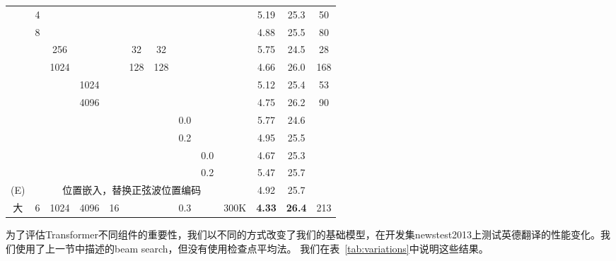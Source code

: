 \begin{table}[t]
\begin{center}
\begin{tabular}{c|ccccccccc|ccc}
& 4 & & & & & & & &            & 5.19 & 25.3 & 50 \\
& 8 & & & & & & & &            & 4.88 & 25.5 & 80 \\
& & 256 & & & 32 & 32 & & &    & 5.75 & 24.5 & 28 \\
& & 1024 & & & 128 & 128 & & & & 4.66 & 26.0 & 168 \\
& & & 1024 & & & & & &         & 5.12 & 25.4 & 53 \\
& & & 4096 & & & & & &         & 4.75 & 26.2 & 90 \\
\hline\rule{0pt}{2.0ex}
\multirow{4}{*}{(D)}
& & & & & & & 0.0 & & & 5.77 & 24.6 &  \\
& & & & & & & 0.2 & & & 4.95 & 25.5 &  \\
& & & & & & & & 0.0 & & 4.67 & 25.3 &  \\
& & & & & & & & 0.2 & & 5.47 & 25.7 &  \\
\hline\rule{0pt}{2.0ex}
(E) & & \multicolumn{7}{c}{位置嵌入，替换正弦波位置编码} & & 4.92 & 25.7 & \\
\hline\rule{0pt}{2.0ex}
大 & 6 & 1024 & 4096 & 16 & & & 0.3 & & 300K & \textbf{4.33} & \textbf{26.4} & 213 \\
\hline
\end{tabular}
\end{center}
\end{table}




为了评估Transformer不同组件的重要性，我们以不同的方式改变了我们的基础模型，在开发集newstest2013上测试英德翻译的性能变化。我们使用了上一节中描述的beam search，但没有使用检查点平均法。 我们在表~\ref{tab:variations}中说明这些结果。

